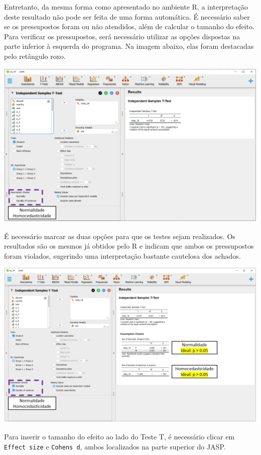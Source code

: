 \documentclass[
]{book}
\begin{document}
Entretanto, da mesma forma como apresentado no ambiente R, a interpretação deste resultado não pode ser feita de uma forma automática. É necessário saber se os pressupostos foram ou não atendidos, além de calcular o tamanho do efeito. Para verificar os pressupostos, será necessário utilizar as opções dispostas na parte inferior à esquerda do programa. Na imagem abaixo, elas foram destacadas pelo retângulo roxo.

\includegraphics{./img/cap_testet_pressupostos.png}

É necessário marcar as duas opções para que os testes sejam realizados. Os resultados são os mesmos já obtidos pelo R e indicam que ambos os pressupostos foram violados, sugerindo uma interpretação bastante cautelosa dos achados.

\includegraphics{./img/cap_testet_pressupostos2.png}

Para inserir o tamanho do efeito ao lado do Teste T, é necessário clicar em \texttt{Effect\ size} e \texttt{Cohen\textquotesingle{}s\ d}, ambos localizados na parte superior do JASP.
\end{document}
